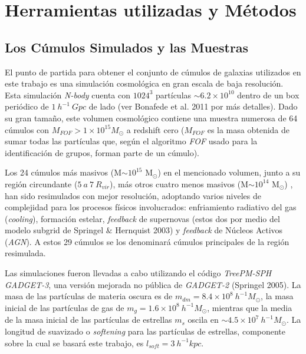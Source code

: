 
\chapter{Herramientas utilizadas y M\'etodos} %

\label{ch:tools} %




\section{Los C\'umulos Simulados y las Muestras}
\label{sec:muestra}
El punto de partida para obtener el conjunto de c\'umulos de galaxias utilizados en este trabajo 
es una simulaci\'on cosmol\'ogica en gran escala de baja resoluci\'on. Esta simulaci\'on {\it N-body} 
cuenta con $1024^3$ part\'iculas $\sim 6.2\times10^{10}$ dentro de un box peri\'odico de $1~h^{-1}~Gpc$ de 
lado (ver Bonafede et al. 2011 por m\'as detalles). Dado su gran tama\~no, este volumen cosmol\'ogico contiene 
una muestra numerosa de 64 c\'umulos con $M_{FOF} > 1\times10^{15}  M_{\odot}$  a redshift cero ($M_{FOF}$ es 
la masa obtenida de sumar todas las part\'iculas que,
seg\'un el algoritmo {\it FOF} usado para la identificaci\'on de grupos, forman parte de un c\'umulo).  

Los 24 c\'umulos m\'as masivos (M$\sim 10^{15}$ M$_{\odot}$) en el mencionado volumen, junto a su regi\'on circundante ($5~ a~ 7~R_{vir}$), m\'as
otros cuatro menos masivos (M$\sim 10^{14}$ M$_{\odot}$) , han sido resimulados con mejor resoluci\'on, adoptando varios niveles de complejidad para 
los procesos f\'isicos involucrados: enfriamiento radiativo del gas ({\it cooling}), formaci\'on estelar, {\it feedback} de supernovas 
(estos dos por medio del modelo subgrid de Springel $\&$ Hernquist 2003) y {\it feedback} de N\'ucleos Activos ({\it AGN}). 
A estos 29 c\'umulos se los denominar\'a c\'umulos principales de la regi\'on resimulada.


Las simulaciones fueron llevadas a cabo utilizando el c\'odigo {\it TreePM-SPH GADGET-3}, una versi\'on mejorada no p\'ublica de {\it GADGET-2} 
(Springel 2005). La masa de las part\'iculas de materia oscura es de $m_{dm}=8.4\times10^8~h^{-1}M_{\odot}$, 
la masa inicial de las part\'iculas 
de gas de $m_{g}=1.6\times10^8~h^{-1}M_{\odot}$, mientras que la media de la masa inicial de las part\'iculas de estrellas 
$m_{s}$ oscila en $\sim 4.5 \times 10^7 ~h^{-1}M_{\odot}$. La longitud de suavizado o {\it softening} para las part\'iculas de estrellas, 
componente sobre la cual se basar\'a este trabajo, es  $l_{soft}=3~h^{-1}kpc$.


